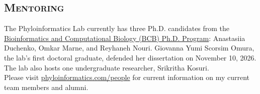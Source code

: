 \documentclass[11pt, letterpaper, sans]{moderncv}
\begin{document}
\vspace{.5em}
\subsection{\textsc{Mentoring}}
\vspace{.5em}

The Phyloinformatics Lab currently has three Ph.D. candidates from the \href{https://cci.charlotte.edu/academics/bioinformatics/bcb-phd-program/}{Bioinformatics and Computational Biology (BCB) Ph.D. Program}: Anastasiia Duchenko, Omkar Marne, and Reyhaneh Nouri. Giovanna Yumi Scorsim Omura, the lab's first doctoral graduate, defended her dissertation on November 10, 2026. The lab also hosts one undergraduate researcher, Srikritha Kosuri.\\

Please visit \href{https://phyloinformatics.com/people/}{phyloinformatics.com/people} for current information on my current team members and alumni.\\

\vspace{.5em}
\end{document}
